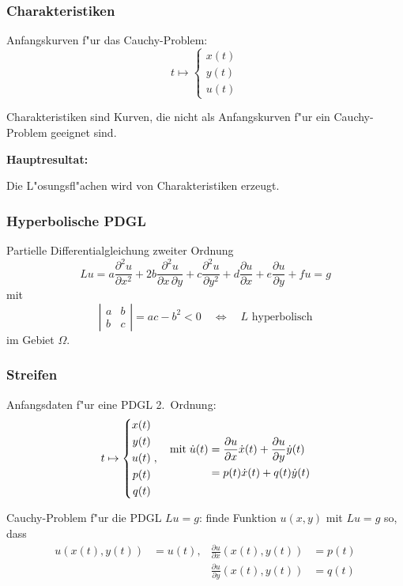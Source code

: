 \documentclass{beamer}
\begin{document}
\begin{frame}
\frametitle{Charakteristiken}

Anfangskurven f"ur das Cauchy-Problem:
\[
t\mapsto \left\{\begin{aligned}
x(t)\\
y(t)\\
u(t)
\end{aligned}\right.
\]

\begin{definition}
Charakteristiken sind Kurven, die nicht als Anfangskurven f"ur ein
Cauchy-Problem geeignet sind.
\end{definition}

\bigskip

{\bf Hauptresultat:}
\medskip

\begin{theorem}
Die L"osungsfl"achen wird von Charakteristiken erzeugt.
\end{theorem}

\end{frame}

\begin{frame}
\frametitle{Hyperbolische PDGL}
Partielle Differentialgleichung zweiter Ordnung
\[
Lu
=
a\frac{\partial^2 u}{\partial x^2}
+
2b \frac{\partial^2 u}{\partial x\,\partial y}
+
c\frac{\partial^2 u}{\partial y^2}
+
d\frac{\partial u}{\partial x}
+
e\frac{\partial u}{\partial y}
+
fu=g
\]
mit
\[
\left|\begin{matrix}
a&b\\b&c
\end{matrix}\right|
=ac-b^2 < 0
\quad\Leftrightarrow\quad
\text{$L$ hyperbolisch}
\]
im Gebiet $\Omega$.
\end{frame}

\begin{frame}
\frametitle{Streifen}

Anfangsdaten f"ur eine PDGL 2.~Ordnung:
\[
t\mapsto
\left\{
\begin{aligned}
x(t)\\
y(t)\\
u(t)\\
p(t)\\
q(t)
\end{aligned}
\right.
,
\quad
\begin{aligned}
\text{mit\;}
\dot u(t)
&=
\frac{\partial u}{\partial x}\dot x(t) + \frac{\partial u}{\partial y}\dot y(t)\\
&=p(t)\dot x(t)+q(t)\dot y(t)
\end{aligned}
\]

\begin{definition}
Cauchy-Problem f"ur die PDGL $Lu = g$: finde Funktion $u(x,y)$ mit $Lu=g$ so,
dass
\begin{align*}
u(x(t),y(t))&=u(t), &\frac{\partial u}{\partial x}(x(t),y(t))&=p(t)\\
            &       &\frac{\partial u}{\partial y}(x(t),y(t))&=q(t)
\end{align*}
\end{definition}

\end{frame}
\end{document}
